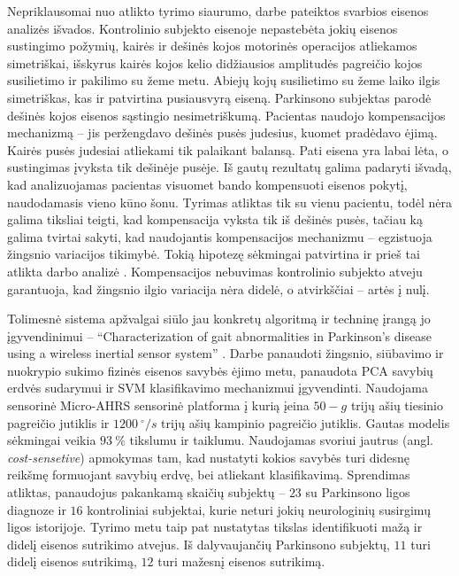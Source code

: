 \documentclass[]{vgtuef}
\begin{document}
Nepriklausomai nuo atlikto tyrimo siaurumo, darbe pateiktos svarbios eisenos analizės išvados. Kontrolinio subjekto eisenoje nepastebėta jokių eisenos sustingimo požymių, kairės ir dešinės kojos motorinės operacijos atliekamos simetriškai, išskyrus kairės kojos kelio didžiausios amplitudės pagreičio kojos susilietimo ir pakilimo su žeme metu. Abiejų kojų susilietimo su žeme laiko ilgis simetriškas, kas ir patvirtina pusiausvyrą eiseną. Parkinsono subjektas parodė dešinės kojos eisenos sąstingio nesimetriškumą. Pacientas naudojo kompensacijos mechanizmą -- jis peržengdavo dešinės pusės judesius, kuomet pradėdavo ėjimą. Kairės pusės judesiai atliekami tik palaikant balansą. Pati eisena yra labai lėta, o sustingimas įvyksta tik dešinėje pusėje. Iš gautų rezultatų galima padaryti išvadą, kad analizuojamas pacientas visuomet bando kompensuoti eisenos pokytį, naudodamasis vieno kūno šonu. Tyrimas atliktas tik su vienu pacientu, todėl nėra galima tiksliai teigti, kad kompensacija vyksta tik iš dešinės pusės, tačiau ką galima tvirtai sakyti, kad naudojantis kompensacijos mechanizmu -- egzistuoja žingsnio variacijos tikimybė. Tokią hipotezę sėkmingai patvirtina ir prieš tai atlikta darbo analizė \cite{5280353}. Kompensacijos nebuvimas kontrolinio subjekto atveju garantuoja, kad žingsnio ilgio variacija nėra didelė, o atvirkščiai -- artės į nulį.


Tolimesnė sistema apžvalgai siūlo jau konkretų algoritmą ir techninę įrangą jo įgyvendinimui -- ``Characterization of gait abnormalities in Parkinson's disease using a wireless inertial sensor system'' \cite{5627904}. Darbe panaudoti žingsnio, siūbavimo ir nuokrypio sukimo fizinės eisenos savybės ėjimo metu, panaudota PCA savybių erdvės sudarymui ir SVM klasifikavimo mechanizmui įgyvendinti. Naudojama sensorinė Micro-AHRS sensorinė platforma į kurią įeina $50-g$ trijų ašių tiesinio pagreičio jutiklis ir $1200~^\circ/s$ trijų ašių kampinio pagreičio jutiklis. Gautas modelis sėkmingai veikia $93~\%$ tikslumu ir taiklumu. Naudojamas svoriui jautrus (angl. \textit{cost-sensetive}) apmokymas tam, kad nustatyti kokios savybės turi didesnę reikšmę formuojant savybių erdvę, bei atliekant klasifikavimą. Sprendimas atliktas, panaudojus pakankamą skaičių subjektų -- $23$ su Parkinsono ligos diagnoze ir $16$ kontroliniai subjektai, kurie neturi jokių neurologinių susirgimų ligos istorijoje. Tyrimo metu taip pat nustatytas tikslas identifikuoti mažą ir didelį eisenos sutrikimo atvejus. Iš dalyvaujančių Parkinsono subjektų, $11$ turi didelį eisenos sutrikimą, $12$ turi mažesnį eisenos sutrikimą. 
\end{document}
